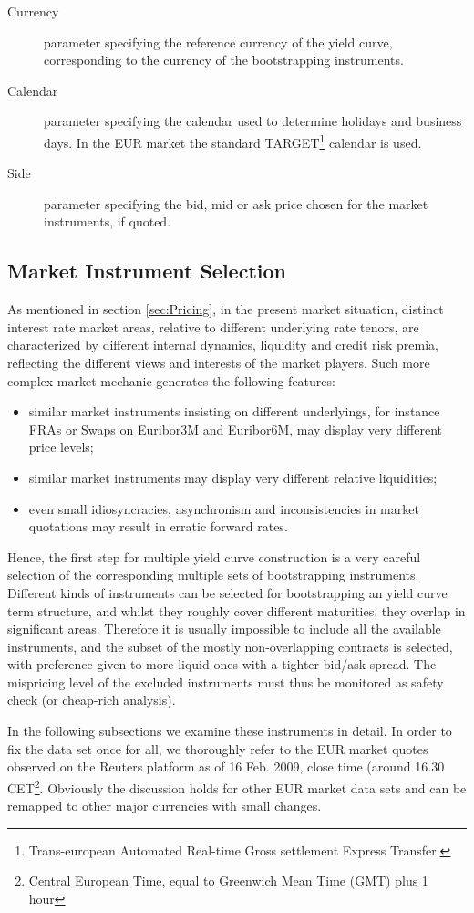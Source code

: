 \documentclass[11pt,reqno]{amsart}
\begin{document}
\begin{description}
  \item[Currency] parameter specifying the reference currency of the yield curve, corresponding to the currency of the bootstrapping instruments.
  \item[Calendar] parameter specifying the calendar used to determine holidays and business days. In the EUR market the standard TARGET\footnote{Trans-european Automated Real-time Gross settlement Express Transfer.} calendar is used.
  \item[Side] parameter specifying the bid, mid or ask price chosen for the market instruments, if quoted.
\end{description}

\subsection{Market Instrument Selection}
\label{sec:MktInstrSelection}
As mentioned in section \ref{sec:Pricing}, in the present market situation, distinct interest rate market areas, relative to different underlying rate tenors, are characterized by different internal dynamics, liquidity and credit risk premia, reflecting the different views and interests of the market players.
Such more complex market mechanic generates the following features:
\begin{itemize}
\item similar market instruments insisting on different underlyings, for instance FRAs or Swaps on Euribor3M and Euribor6M, may display very different price levels;
\item similar market instruments may display very different relative liquidities;
\item even small idiosyncracies, asynchronism and inconsistencies in market quotations may result in erratic forward rates.
\end{itemize}
Hence, the first step for multiple yield curve construction is a very careful selection of the corresponding multiple sets of bootstrapping instruments. Different kinds of instruments can be selected for bootstrapping an yield curve term structure, and whilst they roughly cover different maturities, they overlap in significant areas. Therefore it is usually impossible to include all the available instruments, and the subset of the mostly non-overlapping contracts is selected, with preference given to more liquid ones with a tighter bid/ask spread. The mispricing level of the excluded instruments must thus be monitored as safety check (or cheap-rich analysis).
\par
In the following subsections we examine these instruments in detail. In order to fix the data set once for all, we thoroughly refer to the EUR market quotes observed on the Reuters platform as of 16 Feb. 2009, close time (around 16.30 CET\footnote{Central European Time, equal to Greenwich Mean Time (GMT) plus 1 hour}. Obviously the discussion holds for other EUR market data sets and can be remapped to other major currencies with small changes.
\end{document}
